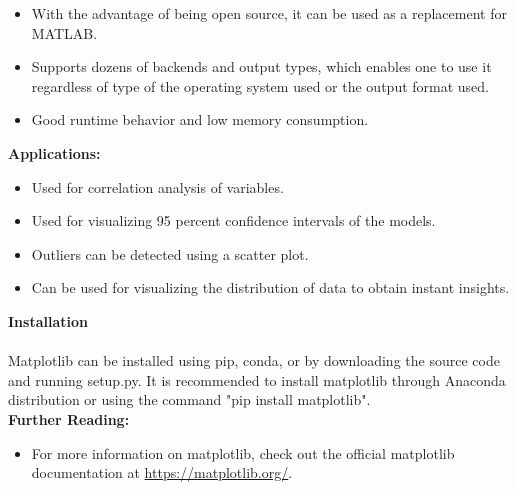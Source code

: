 \begin{itemize}
	\item With the advantage of being open source, it can be used as a replacement for MATLAB.
	\item Supports dozens of backends and output types, which enables one to use it regardless of type of the operating system used or the output format used.
	\item Good runtime behavior and low memory consumption.
\end{itemize}

\textbf{Applications:}

\begin{itemize}
	\item Used for correlation analysis of variables.
	\item Used for visualizing 95 percent confidence intervals of the models.
	\item Outliers can be detected using a scatter plot.
	\item Can be used for visualizing the distribution of data to obtain instant insights.
\end{itemize}

\textbf{Installation}\\\\
Matplotlib can be installed using pip, conda, or by downloading the source code and running setup.py. It is recommended to install matplotlib through Anaconda distribution or using the command "pip install matplotlib".\\

\textbf{Further Reading:}

\begin{itemize}
	\item For more information on matplotlib, check out the official matplotlib documentation at \url{https://matplotlib.org/}.
\end{itemize}


